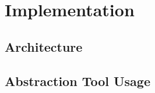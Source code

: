 \chapter{Implementation}
\label{sec:impl}

\section{Architecture}


\section{Abstraction Tool Usage}

